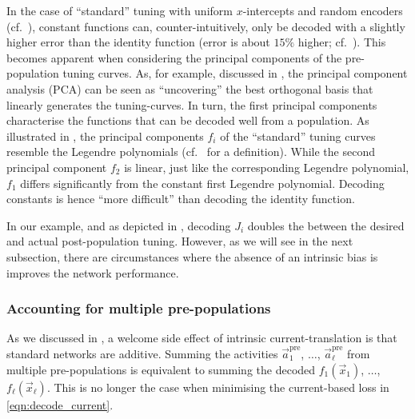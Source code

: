 In the case of \enquote{standard} \NEF tuning with uniform $x$-intercepts and random encoders (cf.~), constant functions can, counter-intuitively, only be decoded with a slightly higher error than the identity function (error is about $15\%$ higher; cf.~).
This becomes apparent when considering the principal components of the pre-population tuning curves.
As, for example, discussed in \citet[Chapter~7]{eliasmith2003neural}, the principal component analysis (PCA) can be seen as \enquote{uncovering} the best orthogonal basis that linearly generates the tuning-curves.
In turn, the first principal components characterise the functions that can be decoded well from a population.
As illustrated in , the principal components $f_i$ of the \enquote{standard} \NEF tuning curves resemble the Legendre polynomials (cf.~ for a definition).
While the second principal component $f_2$ is linear, just like the corresponding Legendre polynomial, $f_1$ differs significantly from the constant first Legendre polynomial.
Decoding constants is hence \enquote{more difficult} than decoding the identity function.

In our example, and as depicted in , decoding $J_i$ doubles the \RMSE between the desired and actual post-population tuning.
However, as we will see in the next subsection, there are circumstances where the absence of an intrinsic bias is improves the network performance.

\subsubsection{Accounting for multiple pre-populations}
As we discussed in , a welcome side effect of intrinsic current-translation is that standard \NEF networks are additive.
Summing the activities $\vec a^\mathrm{pre}_1$, $\ldots$, $\vec a^\mathrm{pre}_\ell$ from multiple pre-populations is equivalent to summing the decoded $f_1(\vec x_1)$, $\ldots$, $f_\ell(\vec x_\ell)$.
This is no longer the case when
minimising the current-based loss in \cref{eqn:decode_current}.

